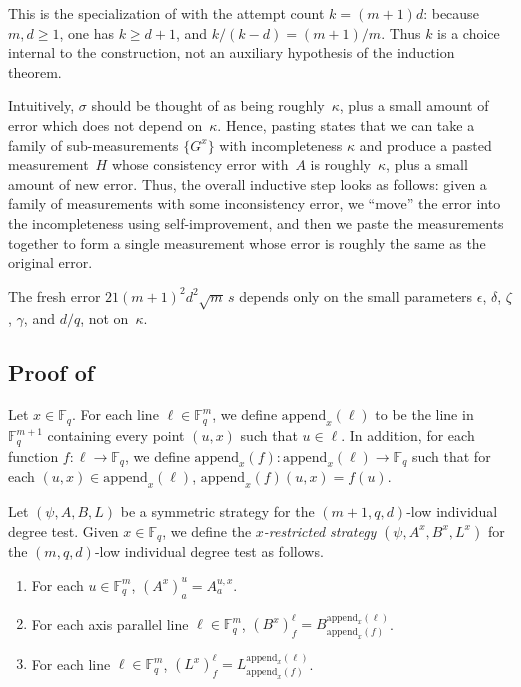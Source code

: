 \documentclass[11pt]{article}
\theoremstyle{definition}
\newcommand{\F}{\mathbb F}
\newcommand{\eps}{\epsilon}
\begin{document}
This is the specialization of  with the attempt
count $k=(m+1)d$: because $m,d\geq1$, one has $k\geq d+1$, and
$k/(k-d)=(m+1)/m$.  Thus $k$ is a choice internal to the construction,
not an auxiliary hypothesis of the induction theorem.

Intuitively, $\sigma$ should be thought of as being roughly~$\kappa$,
plus a small amount of error which does not depend on~$\kappa$.
Hence, pasting states that we can take a family of sub-measurements $\{G^x\}$ with incompleteness $\kappa$
and produce a pasted measurement~$H$ whose consistency error with~$A$ is roughly~$\kappa$,
plus a small amount of new error.
Thus, the overall inductive step looks as follows:
given a family of measurements with some inconsistency error,
we ``move'' the error into the incompleteness using self-improvement,
and then we paste the measurements together to form a single measurement whose error is roughly the same as the original error.

The fresh error $21(m+1)^2d^2\sqrt{m}\,s$ depends only on the small parameters
$\eps$, $\delta$, $\zeta$, $\gamma$, and $d/q$, not on~$\kappa$.

\subsection{\texorpdfstring{Proof of }{Proof of the main induction}}\label{sec:proof-of-main-induction}

\begin{definition}
Let $x \in \F_q$.
For each line $\ell \in \F_q^m$,
we define $\mathrm{append}_x(\ell)$ to be the line in $\F_q^{m+1}$ containing every point $(u, x)$ such that $u \in \ell$.
In addition, for each function $f : \ell \rightarrow \F_q$,
we define $\mathrm{append}_x(f) : \mathrm{append}_x(\ell) \rightarrow \F_q$
such that for each $(u, x) \in \mathrm{append}_x(\ell)$, $\mathrm{append}_x(f)(u, x) = f(u)$.
\end{definition}

\begin{definition}
Let $(\psi, A, B, L)$ be a symmetric strategy for the
$(m+1,q,d)$-low individual degree test.
Given $x \in \F_q$, we define the \emph{$x$-restricted strategy}
$(\psi, A^x, B^x, L^x)$ for the $(m,q,d)$-low individual degree test as follows.
\begin{enumerate}
\item For each $u \in \F_q^m$, $(A^x)^u_a = A^{u, x}_a$.
\item For each axis parallel line $\ell \in \F_q^m$, $(B^x)^\ell_f = B^{\mathrm{append}_x(\ell)}_{\mathrm{append}_x(f)}$.
\item For each  line $\ell \in \F_q^m$, $(L^x)^\ell_f = L^{\mathrm{append}_x(\ell)}_{\mathrm{append}_x(f)}$.
\end{enumerate}
\end{definition}
\end{document}
